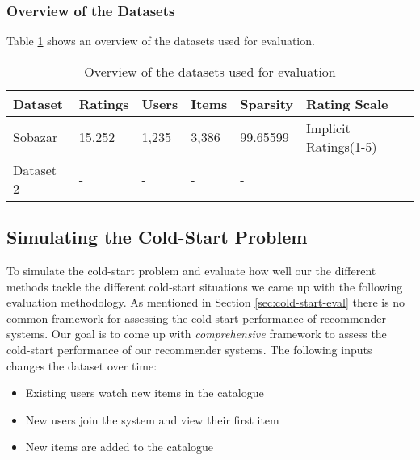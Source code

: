 \subsubsection{Overview of the Datasets}

Table \ref{table:datasets} shows an overview of the datasets used for evaluation.


\begin{table}[H]
    \centering
    \begin{tabular}{|l|l|l|l|l|l|}
    \hline
	Dataset			& 	Ratings 	& 	Users	& 	Items 	& 	Sparsity	& Rating Scale 				\\ \hline
	Sobazar 		& 	15,252  	& 	1,235	&	3,386	&	99.65599	& Implicit Ratings(1-5)		\\ \hline
	Dataset 2 		& 	-  			& 	-		&	-		&	-			&							\\ \hline
    \end{tabular}
    \label{table:datasets}
    \caption [Overview of the datasets used for evaluation]{Overview of the datasets used for evaluation}
\end{table}

\subsection{Simulating the Cold-Start Problem}

To simulate the cold-start problem and evaluate how well our the different
methods tackle the different cold-start situations we came up with the following
evaluation methodology. As mentioned in Section \ref{sec:cold-start-eval} there is
no common framework for assessing the cold-start performance of recommender systems.
Our goal is to come up with \emph{comprehensive} framework to assess the cold-start
performance of our recommender systems. The following inputs changes the dataset over time:

\begin{itemize}
	\item 	Existing users watch new items in the catalogue
	\item	New users join the system and view their first item
	\item	New items are added to the catalogue
\end{itemize}

